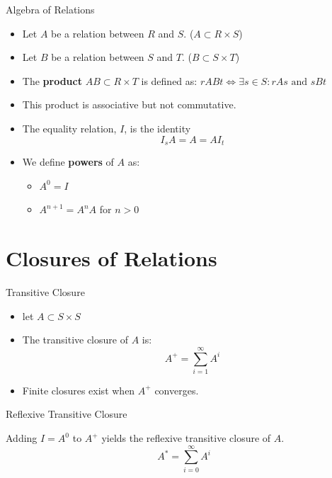 \documentclass{beamer}
\begin{document}
\begin{frame}{Algebra of Relations}
    \begin{itemize}[<+->]
        \item Let $A$ be a relation between $R$ and $S$. 
            ($A\subset R \times S$)
        \item Let $B$ be a relation between $S$ and $T$.
            ($B\subset S \times T$)
        \item The \textbf{product} $AB \subset R \times T$ is defined as: 
            $rABt \iff \exists s \in S : rAs \textrm{ and } sBt$
        \item This product is associative but not commutative.
        \item The equality relation, $I$, is the identity
        \[
            I_sA = A = A I_t
        \]
        \item We define \textbf{powers} of $A$ as:
        \begin{itemize}
            \item $A^0 = I$
            \item $A^{n+1} = A^nA$ for $n > 0$
        \end{itemize}

    \end{itemize}
\end{frame}


\section{Closures of Relations}
\begin{frame}{Transitive Closure}
    \begin{itemize}[<+->]
        \item let $A \subset S \times S$
        \item The transitive closure of $A$ is:
        \[
            A^+ = \displaystyle\sum_{i=1}^{\infty} A^i
        \]
        \item Finite closures exist when $A^+$ converges.

    \end{itemize}
\end{frame}

\begin{frame}{Reflexive Transitive Closure}

    Adding $I=A^0$ to $A^+$ yields the reflexive transitive closure of
    $A$.
        \[
            A^* = \displaystyle\sum_{i=0}^{\infty} A^i
        \]
\end{frame}
\end{document}
